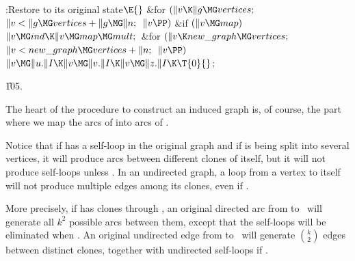 \B{}:Restore  to its original state\X${}\E{}$\6
\&{for} ${}(\|v\K\|g\MG\\{vertices};{}$ ${}\|v<\|g\MG\\{vertices}+\|g\MG\|n;{}$
${}\|v\PP){}$\1\6
\&{if} ${}(\|v\MG\\{map}){}$\1\5
${}\|v\MG\\{ind}\K\|v\MG\\{map}\MG\\{mult};{}$\2\2\6
\&{for} ${}(\|v\K\\{new\_graph}\MG\\{vertices};{}$ ${}\|v<\\{new\_graph}\MG%
\\{vertices}+\|n;{}$ ${}\|v\PP){}$\1\5
${}\|v\MG\|u.\|I\K\|v\MG\|v.\|I\K\|v\MG\|z.\|I\K\T{0}{}$;\2\par
\U105.\fi

The heart of the procedure to construct an induced graph is, of course,
the part where we map the arcs of  into arcs of .

Notice that if  has a self-loop
in the original graph and if  is being split into several vertices,
it will produce arcs between different clones of itself, but it will not
produce self-loops unless . In an undirected graph, a
loop
from a vertex to itself will not produce multiple edges among its clones,
even if .

More precisely, if  has  clones  through , an original
directed arc from  to~ will generate all $k^2$ possible arcs
between
them, except that the  self-loops will be eliminated when
.  An original undirected edge from  to~
will generate
$k\choose2$ edges between distinct clones, together with 
undirected self-loops if .

